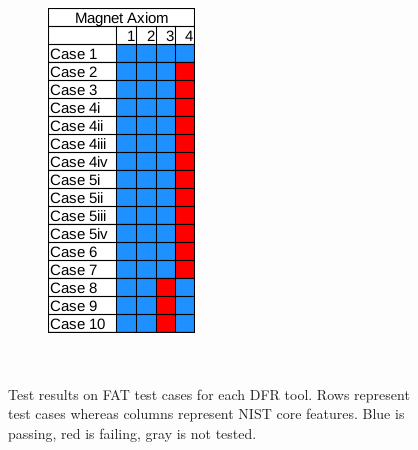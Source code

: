 \begin{figure}[h]
\begin{subfigure}{0.17\linewidth}
    \end{subfigure}~~
    \begin{subfigure}{0.17\linewidth}
        \includegraphics[width=\linewidth]{fig/axiom_results_fat.png}
    \end{subfigure}~~
        
    \caption{Test results on FAT test cases for each DFR tool. Rows represent test cases whereas columns represent NIST core features. Blue is passing, red is failing, gray is not tested.}
    \label{fig:results_fat}
\end{figure}

